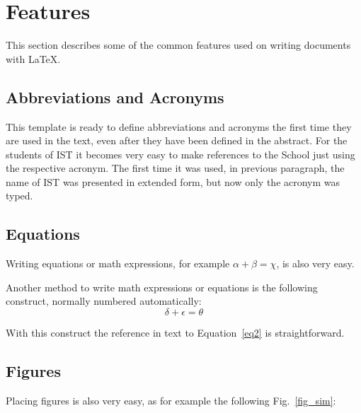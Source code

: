 \documentclass[a4paper,12pt,journal,twoside,compsoc]{PPIEEEtran}
\begin{document}
\section{Features}
This section describes some of the common features used on writing documents with \LaTeX.
\subsection{Abbreviations and Acronyms} 
This template is ready to define abbreviations and acronyms the first time they are used in the text, even after they have been defined in the abstract.
For the students of \ac{IST} it becomes very easy to make references to the School just using the respective acronym. The first time it was used, in previous paragraph, the name of \ac{IST} was presented in extended form, but now only the acronym was typed.
\subsection{Equations}
Writing equations or math expressions, for example $\alpha + \beta = \chi$, is also very easy.

Another method to write math expressions or equations is the following construct, normally numbered automatically:
\begin{equation}
\delta + \epsilon = \theta
\label{eq2}
\end{equation}

With this construct the reference in text to Equation~\ref{eq2} is straightforward.
\subsection{Figures}
Placing figures is also very easy, as for example the following Fig.~\ref{fig_sim}:
\end{document}
